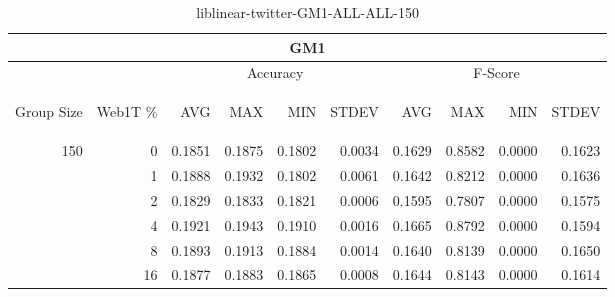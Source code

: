 \begin{center}
\begin{table}[htbp] 
 \begin{center}
\begin{tabular}{ | r | r | r | r | r | r | r | r | r | r |}
\hline
\multicolumn{10}{|c|}{GM1}\\
\hline
 & & \multicolumn{4}{|c|}{Accuracy} & \multicolumn{4}{|c|}{F-Score}\\ \cline{3-10}
\begin{sideways}Group Size\end{sideways} & \begin{sideways}Web1T \%\end{sideways} & \begin{sideways}AVG\end{sideways} & \begin{sideways}MAX\end{sideways} & \begin{sideways}MIN\end{sideways} & \begin{sideways}STDEV\end{sideways} & \begin{sideways}AVG\end{sideways} & \begin{sideways}MAX\end{sideways} & \begin{sideways}MIN\end{sideways} & \begin{sideways}STDEV\end{sideways}\\
\hline
\multirow{5}{*}{150}
 & 0 & 0.1851 & 0.1875 & 0.1802 & 0.0034 & 0.1629 & 0.8582 & 0.0000 & 0.1623\\ \cline{2-10}
 & 1 & 0.1888 & 0.1932 & 0.1802 & 0.0061 & 0.1642 & 0.8212 & 0.0000 & 0.1636\\ \cline{2-10}
 & 2 & 0.1829 & 0.1833 & 0.1821 & 0.0006 & 0.1595 & 0.7807 & 0.0000 & 0.1575\\ \cline{2-10}
 & 4 & 0.1921 & 0.1943 & 0.1910 & 0.0016 & 0.1665 & 0.8792 & 0.0000 & 0.1594\\ \cline{2-10}
 & 8 & 0.1893 & 0.1913 & 0.1884 & 0.0014 & 0.1640 & 0.8139 & 0.0000 & 0.1650\\ \cline{2-10}
 & 16 & 0.1877 & 0.1883 & 0.1865 & 0.0008 & 0.1644 & 0.8143 & 0.0000 & 0.1614\\ \cline{2-10}
\hline
\end{tabular}
\caption{liblinear-twitter-GM1-ALL-ALL-150}
\label{table:liblinear-twitter-GM1-ALL-ALL-150}
\end{center}
 \end{table}
\end{center}

